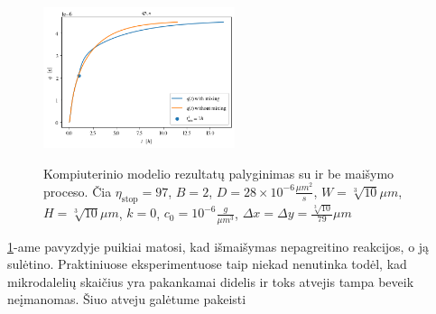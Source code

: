 \newpage

\begin{figure}[h!]
    \centering
    \caption{Kompiuterinio modelio rezultatų palyginimas su ir be maišymo proceso. Čia $\eta_\text{stop} = 97$, $B = 2$, $D = 28\times 10^{-6} \frac{\mu m^2}{s}$, $W = \sqrt[3]{10}\mu m$, $H = \sqrt[3]{10}\mu m$, $k = 0$, $c_0 = 10^{-6} \frac{g}{\mu m^3}$, $\Delta x = \Delta y = \frac{\sqrt[3]{10}}{79} \mu m$ }
    \includegraphics[width=0.5\textwidth]{../paper/assets/bad-mix-qnt-compare.png}
    \label{bad-mix-qnt-example}
\end{figure}

\ref{bad-mix-qnt-example}-ame pavyzdyje puikiai matosi, kad išmaišymas nepagreitino reakcijos, o ją sulėtino. Praktiniuose eksperimentuose taip niekad nenutinka todėl, kad mikrodalelių skaičius yra pakankamai didelis ir toks atvejis tampa beveik neįmanomas. Šiuo atveju galėtume pakeisti 

